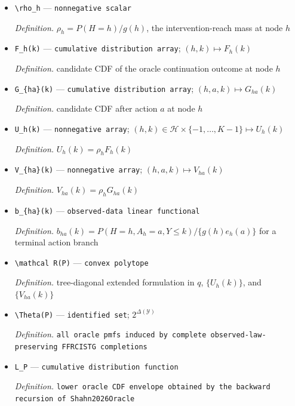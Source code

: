 \documentclass{article}
\begin{document}
\begin{itemize}
  \item \texttt{\textbackslash{}\allowbreak{}rho\_\allowbreak{}h} --- \texttt{nonnegative scalar}
  \par\smallskip\noindent\emph{Definition.} \(\rho_h=P(H=h)/g(h)\), the intervention-reach mass at node \(h\)
  \item \texttt{F\_\allowbreak{}h(k)} --- \texttt{cumulative distribution array}; \((h,k)\mapsto F_h(k)\)
  \par\smallskip\noindent\emph{Definition.} candidate CDF of the oracle continuation outcome at node \(h\)
  \item \texttt{G\_\allowbreak{}\{ha\}\allowbreak{}(k)} --- \texttt{cumulative distribution array}; \((h,a,k)\mapsto G_{ha}(k)\)
  \par\smallskip\noindent\emph{Definition.} candidate CDF after action \(a\) at node \(h\)
  \item \texttt{U\_\allowbreak{}h(k)} --- \texttt{nonnegative array}; \((h,k)\in\mathcal H\times\{-1,\ldots,K-1\}\mapsto U_h(k)\)
  \par\smallskip\noindent\emph{Definition.} \(U_h(k)=\rho_hF_h(k)\)
  \item \texttt{V\_\allowbreak{}\{ha\}\allowbreak{}(k)} --- \texttt{nonnegative array}; \((h,a,k)\mapsto V_{ha}(k)\)
  \par\smallskip\noindent\emph{Definition.} \(V_{ha}(k)=\rho_hG_{ha}(k)\)
  \item \texttt{b\_\allowbreak{}\{ha\}\allowbreak{}(k)} --- \texttt{observed-\allowbreak{}data linear functional}
  \par\smallskip\noindent\emph{Definition.} \(b_{ha}(k)=P(H=h,A_h=a,Y\leq k)/\{g(h)e_h(a)\}\) for a terminal action branch
  \item \texttt{\textbackslash{}\allowbreak{}mathcal R(P)} --- \texttt{convex polytope}
  \par\smallskip\noindent\emph{Definition.} tree-diagonal extended formulation in \(q\), \(\{U_h(k)\}\), and \(\{V_{ha}(k)\}\)
  \item \texttt{\textbackslash{}\allowbreak{}Theta(P)} --- \texttt{identified set}; \(2^{\Delta(\mathcal Y)}\)
  \par\smallskip\noindent\emph{Definition.} \texttt{all oracle pmfs induced by complete observed-\allowbreak{}law-\allowbreak{}preserving FFRCISTG completions}
  \item \texttt{L\_\allowbreak{}P} --- \texttt{cumulative distribution function}
  \par\smallskip\noindent\emph{Definition.} \texttt{lower oracle CDF envelope obtained by the backward recursion of Shahn2026Oracle}

\end{itemize}
\end{document}
